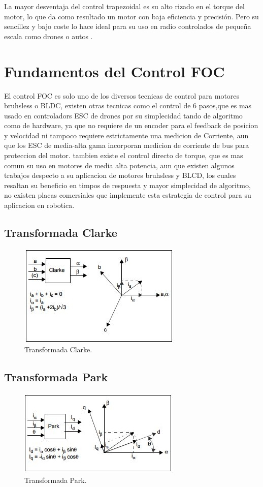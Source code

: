 \documentclass[11pt]{report}
\begin{document}
La mayor desventaja del control trapezoidal es su alto rizado en el torque del motor, lo que da como resultado un motor con baja eficiencia y precisión. Pero su sencillez y bajo coste lo hace ideal para su uso en radio controlados de pequeña escala como drones o autos \cite{juanpere_tecnicas}.

\section{Fundamentos del Control FOC}

El control FOC es solo uno de los diversos tecnicas de control para motores bruhsless o BLDC, existen otras tecnicas como el control de 6 pasos,que es mas usado en controladors ESC de drones por su simplecidad tando de algoritmo como de hardware, ya que no requiere de un encoder para el feedback de posicion y velocidad ni tampoco requiere estrictamente una medicion de Corriente, aun que los ESC de media-alta gama incorporan medicion de corriente de bus para proteccion del motor. tambien existe el control directo de torque, que es mas comun su uso en motores de media alta potencia, aun que existen algunos trabajos despecto a su aplicacion de motores bruhsless y BLCD, los cuales resaltan su beneficio en timpos de respuesta y mayor simplecidad de algoritmo, no existen placas comersiales que implemente esta estrategia de control para su aplicacion en robotica.

\subsection{Transformada Clarke}
\begin{figure}[ht]
	\centering
	\includegraphics{imagenes/clarke.jpg}
	\caption{Transformada Clarke.}
\end{figure}
\FloatBarrier

\subsection{Transformada Park}
\begin{figure}[ht]
	\centering
	\includegraphics{imagenes/park.jpg}
	\caption{Transformada Park.}
\end{figure}
\FloatBarrier
\end{document}

